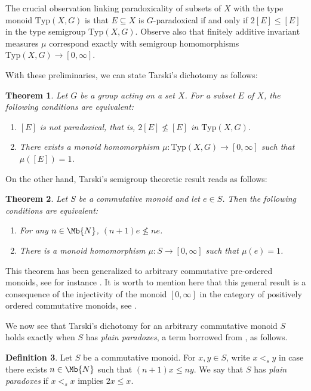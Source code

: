 \documentclass[11pt]{amsart}
\def\N{\mathbb{N}}
\theoremstyle{plain}            %
\newtheorem{theorem}{Theorem}[section]
\theoremstyle{definition}       %
\newtheorem{definition}[theorem]{Definition}
\theoremstyle{definition}       %
\theoremstyle{remark}
\newcommand{\Typ}{\mathrm{Typ}}
\def\N{\mathbb{N}}
\def\N{\Mb{N}}
\def\N{\Mb{N}}
\begin{document}
The crucial observation linking paradoxicality of subsets of $X$ with the type monoid $\Typ (X,G)$ is that $E\subseteq X$ is $G$-paradoxical if and only if $2[E]\le [E]$ in the type semigroup $\Typ (X,G)$.  
Observe also that finitely additive invariant measures $\mu$ correspond exactly with semigroup homomorphisms $\Typ (X,G)\to [0,\infty]$. 


With these preliminaries, we can state Tarski's dichotomy as follows:

\begin{theorem}
	\label{thm:TarskiDichotomy}
	Let $G$ be a group acting on a set $X$. For a subset $E$ of $X$, the following conditions are equivalent:
	\begin{enumerate}
		\item[(a)] $[E]$ is not paradoxical, that is, $2[E]\nleq [E]$ in $\Typ (X,G)$.
		\item[(b)] There exists a monoid homomorphism $\mu\colon \Typ (X,G)\to [0,\infty]$ such that $\mu ([E])= 1$.   
	\end{enumerate}
\end{theorem}


On the other hand, Tarski's semigroup theoretic result reads as follows:

\begin{theorem} {\rm{\cite[Theorem 11.1]{TomWagon}}}
	\label{thm:tarski-semigroup}
	Let $S$ be a commutative monoid and let $e\in S$.
	Then the following conditions are equivalent:
	\begin{enumerate}
		\item[(a)] For any $n\in \N$, $(n+1)e \nleq ne$.
		\item[(b)] There is a monoid homomorphism $\mu \colon S \to [0,\infty]$ such that $\mu (e)= 1$.  
	\end{enumerate}
\end{theorem}

This theorem has been generalized to arbitrary commutative pre-ordered monoids, see for instance \cite[Corollary 2.18]{KMP25}. It is worth to mention here that this general result is a consequence of the 
injectivity of the monoid $[0,\infty]$ in the category of positively ordered commutative monoids, see \cite[Example 3.10]{weh1992}. 

We now see that Tarski's dichotomy for an arbitrary commutative monoid $S$ holds exactly when $S$ has {\it plain paradoxes}, a term borrowed from \cite{KMP25}, as follows.  

\begin{definition}
	\label{def:plain-paradox} 
	Let $S$ be a commutative monoid. For $x,y\in S$, write $x<_s y$ in case there exists $n\in \N$ such that $(n+1)x\le ny$.  We say that $S$ has {\it plain paradoxes} if $x<_s x$ implies $2x\le x$.  
\end{definition}
\end{document}
